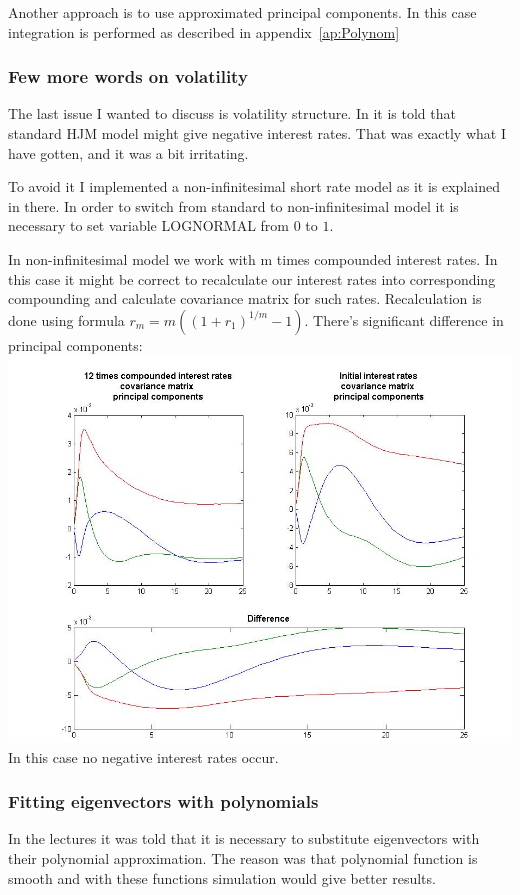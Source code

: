 \documentclass[11pt]{article} %
\begin{document}
Another approach is to use approximated principal components. In this case integration is performed as described in appendix~\ref{ap:Polynom}

\subsubsection{Few more words on volatility}
The last issue I wanted to discuss is volatility structure. In \cite[par. 37.15]{PWoQF06} it is told that standard HJM model might give negative interest rates. That was exactly what I have gotten, and it was a bit irritating. 

To avoid it I implemented a non-infinitesimal short rate model as it is explained in there. In order to switch from standard to non-infinitesimal model it is necessary to set variable LOGNORMAL from $0$ to $1$.

In non-infinitesimal model we work with m times compounded interest rates. In this case it might be correct to recalculate our interest rates into corresponding compounding and calculate covariance matrix for such rates. Recalculation is done using formula $r_m = m\left((1+r_1)^{1/m}-1\right)$. There's significant difference in principal components:\\
\includegraphics[scale=0.4]{compounding_PCA.jpg}\\
In this case no negative interest rates occur.

\subsubsection{Fitting eigenvectors with polynomials}
In the lectures it was told that it is necessary to substitute eigenvectors with their polynomial approximation. The reason was that polynomial function is smooth and with these functions simulation would give better results.
\end{document}
